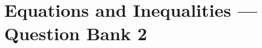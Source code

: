 \documentclass[12pt, fleqn, openany, oneside]{studyGuide}
\begin{document}

\chapter{Equations and Inequalities — Question Bank 2}










\printAnswerKey
\end{document}
